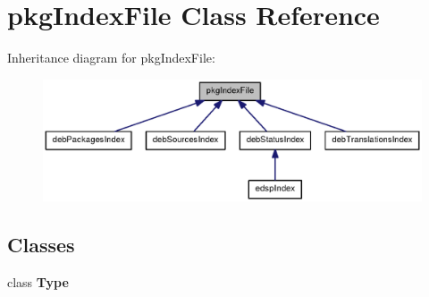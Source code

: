 \section{pkg\-Index\-File \-Class \-Reference}
\label{classpkgIndexFile}


\-Inheritance diagram for pkg\-Index\-File\-:
\nopagebreak
\begin{figure}[H]
\begin{center}
\leavevmode
\includegraphics[width=350pt]{classpkgIndexFile__inherit__graph}
\end{center}
\end{figure}
\subsection*{\-Classes}
\begin{DoxyCompactItemize}
\item 
class {\bf \-Type}
\end{DoxyCompactItemize}
